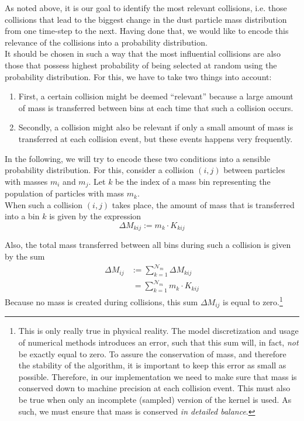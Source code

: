     As noted above, it is our goal to identify the most relevant collisions, i.e. those collisions 
    that lead to the biggest change in the dust particle mass distribution from one time-step to 
    the next.
    Having done that, we would like to encode this relevance of the collisions into a probability
    distribution. \\

    It should be chosen in such a way that the most influential collisions are also those that 
    possess highest probability of being selected at random using the probability distribution. 
    For this, we have to take two things into account: 
    \begin{enumerate}
        \item First, a certain collision might be deemed ``relevant'' because a large amount of mass
              is transferred between bins at each time that such a collision occurs.
        \item Secondly, a collision might also be relevant if only a small amount of mass is
              transferred at each collision event, but these events happens very frequently.
    \end{enumerate}

    In the following, we will try to encode these two conditions into a sensible probability 
    distribution. 
    For this, consider a collision $(i, j)$ between particles with masses $m_i$ and $m_j$. 
    Let $k$ be the index of a mass bin representing the population of particles with mass $m_k$. \\

    When such a collision $(i, j)$ takes place, the amount of mass that is transferred into
    a bin $k$ is given by the expression 
    \begin{equation}
      \Delta M_{kij} := m_k \cdot K_{kij}
    \end{equation}

    Also, the total mass transferred between all bins during such a collision is given by the sum 
    \begin{align}
        \label{eq:total_mass_being_moved_between_bins_on_collision_ij}
        \Delta M_{ij} 
        &:= \sum_{k=1}^{\mathcal N_m} \Delta M_{kij} \\
        &\ = \sum_{k=1}^{\mathcal N_m} m_k \cdot K_{kij}
    \end{align}
    Because no mass is created during collisions, this sum $\Delta M_{ij}$ is equal to 
    zero.\footnote{ 
        This is only really true in physical reality.
        The model discretization and usage of numerical methods introduces an error, 
        such that this sum will, in fact, \textit{not} be exactly equal to zero. 
        To assure the conservation of mass, and therefore the stability of the algorithm, it is
        important to keep this error as small as possible. Therefore, in our implementation we need
        to make sure that mass is conserved down to machine precision at each collision event.
        This must also be true when only an incomplete (sampled) version of the kernel is 
        used. As such, we must ensure that mass is conserved \textit{in detailed balance}.
    } \\

